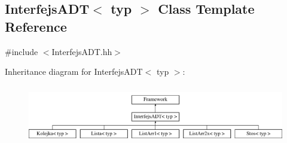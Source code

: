 \hypertarget{class_interfejs_a_d_t}{\subsection{Interfejs\-A\-D\-T$<$ typ $>$ Class Template Reference}
\label{class_interfejs_a_d_t}
}


{\ttfamily \#include $<$Interfejs\-A\-D\-T.\-hh$>$}

Inheritance diagram for Interfejs\-A\-D\-T$<$ typ $>$\-:\begin{figure}[H]
\begin{center}
\leavevmode
\includegraphics[height=2.564885cm]{class_interfejs_a_d_t}
\end{center}
\end{figure}
